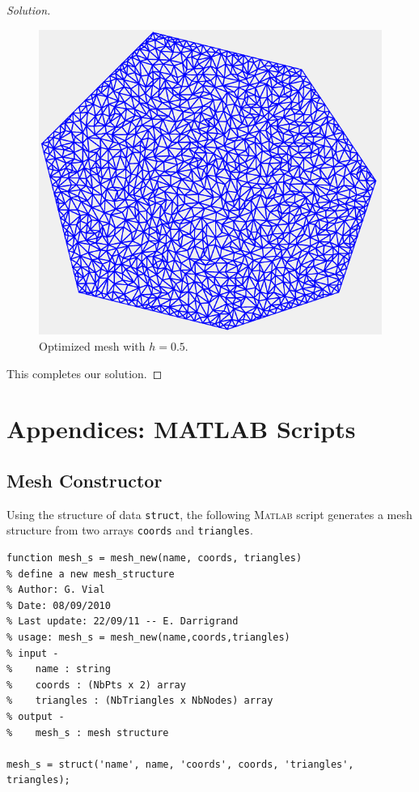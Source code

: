 \documentclass[11pt,a4paper,center,notitlepage]{article}
\numberwithin{equation}{section}
\begin{document}
\begin{proof}[Solution]
\begin{figure}[H]
\centering
\includegraphics[scale=0.9]{mesh_optimize_05}
\caption{Optimized mesh with $h=0.5$.}
\end{figure}
This completes our solution.
\end{proof}
\section{Appendices: \textsc{MATLAB} Scripts}

\subsection{Mesh Constructor}
Using the structure of data \texttt{struct}, the following \textsc{Matlab} script generates a mesh structure from two arrays \texttt{coords} and \texttt{triangles}.
\begin{verbatim}
function mesh_s = mesh_new(name, coords, triangles)
% define a new mesh_structure
% Author: G. Vial
% Date: 08/09/2010
% Last update: 22/09/11 -- E. Darrigrand
% usage: mesh_s = mesh_new(name,coords,triangles)
% input -
%    name : string
%    coords : (NbPts x 2) array
%    triangles : (NbTriangles x NbNodes) array
% output -
%    mesh_s : mesh structure

mesh_s = struct('name', name, 'coords', coords, 'triangles', triangles);
\end{verbatim}
\end{document}
